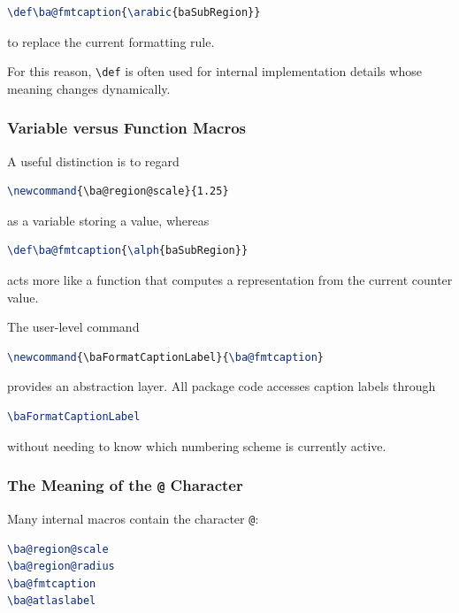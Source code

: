 \begin{lstlisting}[language={LaTeX}]
\def\ba@fmtcaption{\arabic{baSubRegion}}
\end{lstlisting}

to replace the current formatting rule.

For this reason, \lstinline|\def| is often used for internal implementation details whose meaning changes dynamically.

\subsubsection{Variable versus Function Macros}

A useful distinction is to regard

\begin{lstlisting}[language={LaTeX}]
\newcommand{\ba@region@scale}{1.25}
\end{lstlisting}

as a variable storing a value, whereas

\begin{lstlisting}[language={LaTeX}]
\def\ba@fmtcaption{\alph{baSubRegion}}
\end{lstlisting}

acts more like a function that computes a representation from the current counter value.

The user-level command

\begin{lstlisting}[language={LaTeX}]
\newcommand{\baFormatCaptionLabel}{\ba@fmtcaption}
\end{lstlisting}

provides an abstraction layer. All package code accesses caption labels through

\begin{lstlisting}[language={LaTeX}]
\baFormatCaptionLabel
\end{lstlisting}

without needing to know which numbering scheme is currently active.

\subsubsection{The Meaning of the \texttt{@} Character}

Many internal macros contain the character \lstinline|@|:

\begin{lstlisting}[language={LaTeX}]
\ba@region@scale
\ba@region@radius
\ba@fmtcaption
\ba@atlaslabel
\end{lstlisting}

